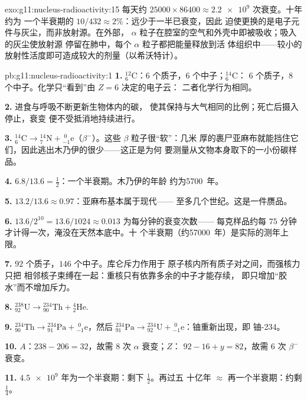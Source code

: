 \begin{solution}{exo:g11:nucleus-radioactivity:15}
每天约 $\num{25000} \times 86400 \approx \num{2.2e9}$ 次衰变。十年约为
一个半衰期的 $10/432 \approx 2\%$：远少于一半已衰变，因此
迫使更换的是电子元件与灰尘，而非放射源。在外部，
$\alpha$ 粒子在腔室的空气和外壳中即被吸收；吸入的灰尘使放射源
停留在肺中，每个 $\alpha$ 粒子都把能量释放到活
体组织中——较小的放射性活度即可造成较大的剂量（以希沃特计）。
\end{solution}

\begin{solution}{pb:g11:nucleus-radioactivity:1}
\textbf{1.} ${}^{12}_{6}\mathrm{C}$：$6$ 个质子，$6$ 个中子；${}^{14}_{6}\mathrm{C}$：
$6$ 个质子，$8$ 个中子。化学只“看到”由 $Z = 6$ 决定的电子云：
二者化学行为相同。

\textbf{2.} 进食与呼吸不断更新生物体内的碳，
使其保持与大气相同的比例；死亡后摄入停止，衰变
便不受抵消地持续进行。

\textbf{3.} ${}^{14}_{6}\mathrm{C} \to {}^{14}_{7}\mathrm{N} +
{}^{\;0}_{-1}\mathrm{e}$（$\beta^-$）。这些 $\beta$ 粒子很“软”：几米
厚的裹尸亚麻布就能挡住它们，因此逃出木乃伊的很少——这正是为何
要测量从文物本身取下的一小份碳样品。

\textbf{4.} $6.8/13.6 = \frac12$：一个半衰期。木乃伊的年龄
约为\num{5700}~年。

\textbf{5.} $13.2/13.6 \approx 0.97$：亚麻布基本属于现代——
至多几个世纪。这是一件赝品。

\textbf{6.} $13.6/2^{10} = 13.6/1024 \approx 0.013$ 为每分钟的衰变次数——
每克样品约每 $75$ 分钟才计得一次，淹没在天然本底中。十
个半衰期（约\num{57000}~年）是实际的测年上限。

\textbf{7.} $92$ 个质子，$146$ 个中子。库仑斥力作用于
原子核内所有质子对之间，而强核力只把
相邻核子束缚在一起：重核只有依靠多余的中子才能存续，
即只增加“胶水”而不增加斥力。

\textbf{8.} ${}^{238}_{92}\mathrm{U} \to {}^{234}_{90}\mathrm{Th} +
{}^{4}_{2}\mathrm{He}$.

\textbf{9.} ${}^{234}_{90}\mathrm{Th} \to {}^{234}_{91}\mathrm{Pa} +
{}^{\;0}_{-1}\mathrm{e}$，然后 ${}^{234}_{91}\mathrm{Pa} \to
{}^{234}_{92}\mathrm{U} + {}^{\;0}_{-1}\mathrm{e}$：铀重新出现，即
铀-234。

\textbf{10.} $A$：$238 - 206 = 32$，故需 $8$ 次 $\alpha$ 衰变；$Z$：
$92 - 16 + y = 82$，故需 $6$ 次 $\beta^-$ 衰变。

\textbf{11.} $\num{4.5e9}$ 年为一个半衰期：剩下 $\frac12$。再过五
十亿年 $\approx$ 再一个半衰期：约剩 $\frac14$。


\end{solution}

